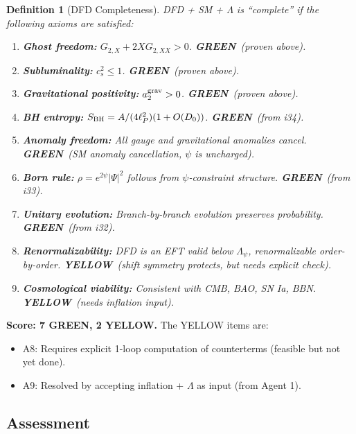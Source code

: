 \documentclass[11pt,a4paper]{article}
\newtheorem{definition}{Definition}
\newcommand{\GREEN}{\textcolor{dfdgreen}{\textbf{GREEN}}}
\newcommand{\YELLOW}{\textcolor{dfdyellow}{\textbf{YELLOW}}}
\begin{document}
\begin{definition}[DFD Completeness]
DFD + SM + $\Lambda$ is ``complete'' if the following axioms are satisfied:
\begin{enumerate}
\item[\textbf{A1.}] \textbf{Ghost freedom:} $G_{2,X} + 2XG_{2,XX} > 0$. \GREEN\ (proven above).
\item[\textbf{A2.}] \textbf{Subluminality:} $c_s^2 \leq 1$. \GREEN\ (proven above).
\item[\textbf{A3.}] \textbf{Gravitational positivity:} $a_2^{\rm grav} > 0$. \GREEN\ (proven above).
\item[\textbf{A4.}] \textbf{BH entropy:} $S_{\rm BH} = A/(4\ell_P^2)(1 + O(D_0))$. \GREEN\ (from i34).
\item[\textbf{A5.}] \textbf{Anomaly freedom:} All gauge and gravitational anomalies cancel. \GREEN\ (SM anomaly cancellation, $\psi$ is uncharged).
\item[\textbf{A6.}] \textbf{Born rule:} $\rho = e^{2\psi}|\Psi|^2$ follows from $\psi$-constraint structure. \GREEN\ (from i33).
\item[\textbf{A7.}] \textbf{Unitary evolution:} Branch-by-branch evolution preserves probability. \GREEN\ (from i32).
\item[\textbf{A8.}] \textbf{Renormalizability:} DFD is an EFT valid below $\Lambda_\psi$, renormalizable order-by-order. \YELLOW\ (shift symmetry protects, but needs explicit check).
\item[\textbf{A9.}] \textbf{Cosmological viability:} Consistent with CMB, BAO, SN Ia, BBN. \YELLOW\ (needs inflation input).
\end{enumerate}
\end{definition}

\textbf{Score: 7 GREEN, 2 YELLOW.} The YELLOW items are:
\begin{itemize}
\item A8: Requires explicit 1-loop computation of counterterms (feasible but not yet done).
\item A9: Resolved by accepting inflation + $\Lambda$ as input (from Agent 1).
\end{itemize}

\subsection{Assessment}
\end{document}
